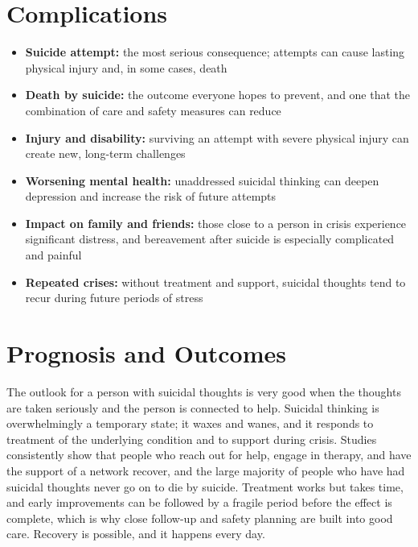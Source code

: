 \section*{Complications}
\begin{itemize}
    \item \textbf{Suicide attempt:} the most serious consequence; attempts can cause lasting physical injury and, in some cases, death
    \item \textbf{Death by suicide:} the outcome everyone hopes to prevent, and one that the combination of care and safety measures can reduce
    \item \textbf{Injury and disability:} surviving an attempt with severe physical injury can create new, long-term challenges
    \item \textbf{Worsening mental health:} unaddressed suicidal thinking can deepen depression and increase the risk of future attempts
    \item \textbf{Impact on family and friends:} those close to a person in crisis experience significant distress, and bereavement after suicide is especially complicated and painful
    \item \textbf{Repeated crises:} without treatment and support, suicidal thoughts tend to recur during future periods of stress
\end{itemize}

\section*{Prognosis and Outcomes}
The outlook for a person with suicidal thoughts is very good when the thoughts are taken seriously and the person is connected to help. Suicidal thinking is overwhelmingly a temporary state; it waxes and wanes, and it responds to treatment of the underlying condition and to support during crisis. Studies consistently show that people who reach out for help, engage in therapy, and have the support of a network recover, and the large majority of people who have had suicidal thoughts never go on to die by suicide. Treatment works but takes time, and early improvements can be followed by a fragile period before the effect is complete, which is why close follow-up and safety planning are built into good care. Recovery is possible, and it happens every day.

